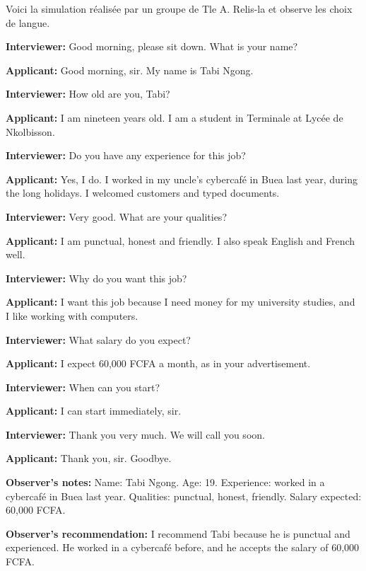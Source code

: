 \documentclass[11pt]{article}
\begin{document}
\begin{exoresolu}
Voici la simulation réalisée par un groupe de Tle A. Relis-la et observe les choix de langue.

\textbf{Interviewer:} Good morning, please sit down. What is your name?

\textbf{Applicant:} Good morning, sir. My name is Tabi Ngong.

\textbf{Interviewer:} How old are you, Tabi?

\textbf{Applicant:} I am nineteen years old. I am a student in Terminale at Lycée de Nkolbisson.

\textbf{Interviewer:} Do you have any experience for this job?

\textbf{Applicant:} Yes, I do. I worked in my uncle's cybercafé in Buea last year, during the long holidays. I welcomed customers and typed documents.

\textbf{Interviewer:} Very good. What are your qualities?

\textbf{Applicant:} I am punctual, honest and friendly. I also speak English and French well.

\textbf{Interviewer:} Why do you want this job?

\textbf{Applicant:} I want this job because I need money for my university studies, and I like working with computers.

\textbf{Interviewer:} What salary do you expect?

\textbf{Applicant:} I expect 60,000 FCFA a month, as in your advertisement.

\textbf{Interviewer:} When can you start?

\textbf{Applicant:} I can start immediately, sir.

\textbf{Interviewer:} Thank you very much. We will call you soon.

\textbf{Applicant:} Thank you, sir. Goodbye.

\textbf{Observer's notes:} Name: Tabi Ngong. Age: 19. Experience: worked in a cybercafé in Buea last year. Qualities: punctual, honest, friendly. Salary expected: 60,000 FCFA.

\textbf{Observer's recommendation:} I recommend Tabi because he is punctual and experienced. He worked in a cybercafé before, and he accepts the salary of 60,000 FCFA.

\tcblower


\end{exoresolu}
\end{document}
